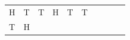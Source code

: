 {\begin{tabular}[t]{|l|l|l|l|l|l|l|l|l|l|}
    
        H &
    
    
        T &
    
    
        T &
    
    
        H &
    
    
        T &
    
    
        T%
     \tabularnewline\cline{1-1}\cline{2-2}\cline{3-3}\cline{4-4}\cline{5-5}\cline{6-6}\cline{7-7}\cline{8-8}\cline{9-9}\cline{10-10}
    
    
        T &
    
    
        H &
    
    

\end{tabular}}
